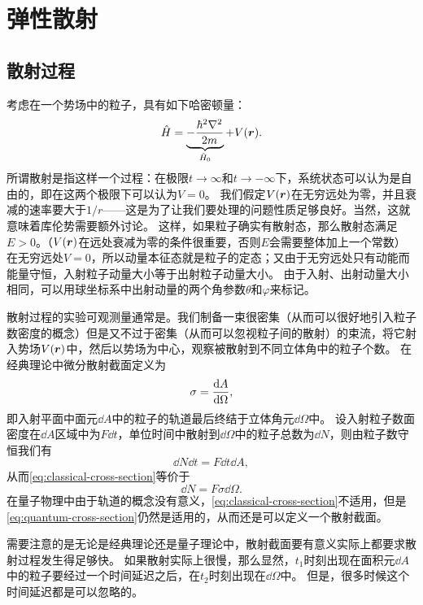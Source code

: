 \chapter{弹性散射}

\section{散射过程}

考虑在一个势场中的粒子，具有如下哈密顿量：
\begin{equation}
    \hat{H} = \underbrace{- \frac{\hbar^2 \laplacian}{2m}}_{\hat{H}_0} + V(\vb*{r}).
\end{equation}
所谓散射是指这样一个过程：在极限$t\to \infty$和$t \to -\infty$下，系统状态可以认为是自由的，即在这两个极限下可以认为$V=0$。
我们假定$V(\vb*{r})$在无穷远处为零，并且衰减的速率要大于$1/r$——这是为了让我们要处理的问题性质足够良好。当然，这就意味着库伦势需要额外讨论。
这样，如果粒子确实有散射态，那么散射态满足$E > 0$。（$V(\vb*{r})$在远处衰减为零的条件很重要，否则$E$会需要整体加上一个常数）
在无穷远处$V=0$，所以动量本征态就是粒子的定态；又由于无穷远处只有动能而能量守恒，入射粒子动量大小等于出射粒子动量大小。
由于入射、出射动量大小相同，可以用球坐标系中出射动量的两个角参数$\theta$和$\varphi$来标记。

散射过程的实验可观测量通常是。我们制备一束很密集（从而可以很好地引入粒子数密度的概念）但是又不过于密集（从而可以忽视粒子间的散射）的束流，将它射入势场$V(\vb*{r})$中，然后以势场为中心，观察被散射到不同立体角中的粒子个数。
在经典理论中微分散射截面定义为
\begin{equation}
    \sigma = \dv{A}{\Omega},
    \label{eq:classical-cross-section}
\end{equation}
即入射平面中面元$\dd{A}$中的粒子的轨道最后终结于立体角元$\dd{\Omega}$中。
设入射粒子数面密度在$\dd{A}$区域中为$F \dd{t}$，单位时间中散射到$\dd{\Omega}$中的粒子总数为$\dd{N}$，则由粒子数守恒我们有
\[
    \dd{N} \dd{t} = F \dd{t} \dd{A},
\]
从而\eqref{eq:classical-cross-section}等价于
\begin{equation}
    \dd{N} = F \sigma \dd{\Omega}.
    \label{eq:quantum-cross-section}
\end{equation}
在量子物理中由于轨道的概念没有意义，\eqref{eq:classical-cross-section}不适用，但是\eqref{eq:quantum-cross-section}仍然是适用的，从而还是可以定义一个散射截面。

需要注意的是无论是经典理论还是量子理论中，散射截面要有意义实际上都要求散射过程发生得足够快。
如果散射实际上很慢，那么显然，$t_1$时刻出现在面积元$\dd{A}$中的粒子要经过一个时间延迟之后，在$t_2$时刻出现在$\dd{\Omega}$中。
但是，很多时候这个时间延迟都是可以忽略的。

